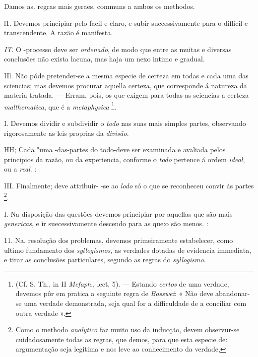 
  
Damos as. regras mais geraes, communs a ambos os methodos.

l1. Devemos principiar pelo facil e claro, e subir successivamente para o difficil e transcendente. A razão é manifesta.

\emph{IT}. O -processo deve ser \emph{ordenado}, de modo que entre as muitas e diversas conclusões não exista lacuna, mas haja um nexo intimo e gradual.

IIl. Não póde pretender-se a mesma especie de certeza em todas e cada uma das sciencias; mas devemos procurar aquella certeza, que corresponde á natureza da materia tratada. --- Erram, pois, os que exigem para todas as sciencias a certeza \emph{malthematica}, que é a \emph{metaphysica} \footnote{(Cf. S. Th., in II \emph{Mefaph}., lect, 5). --- Estando \emph{certos} de uma verdade, devemos pôr em pratica a seguinte regra de \emph{Bosswei}: « Não deve abandonar-se uma verdade demonstrada, seja qual for a difficuldade de a conciliar com outra verdade ».}.



I. Devemos dividir e subdividir o \emph{todo} nas suas mais simples partes, observando rigorosamente as leis proprias da \emph{divisão}.

HH; Cada "uma -das-partes do todo-deve ser examinada e avaliada pelos principios da razão, ou da experiencia, conforme o \emph{todo} pertence á ordem \emph{ideal}, ou a \emph{real}. :

III. Finalmente; deve attribuir- -se ao \emph{lodo} só o que se reconheceu convir ás partes \footnote{Como o methodo \emph{analytico} faz muito uso da inducção, devem observur-se cuidadosamente todas as regras, que demos, para que esta especie de: argumentação seja legitima e nos leve ao conhecimento da verdade,}.



I. Na disposição das questões devemos principiar por aquellas que são mais \emph{genericas}, e ir suecessivamente descendo para as que:o são menos. \textbar{} :

11. Na. resolução dos problemas, devemos primeiramente estabelecer, como ultimo fundamento dos \emph{syllogismos}, as verdades dotadas de evidencia immediata, e tirar as conclusões particulares, segundo as regras do \emph{syllogismo}.

